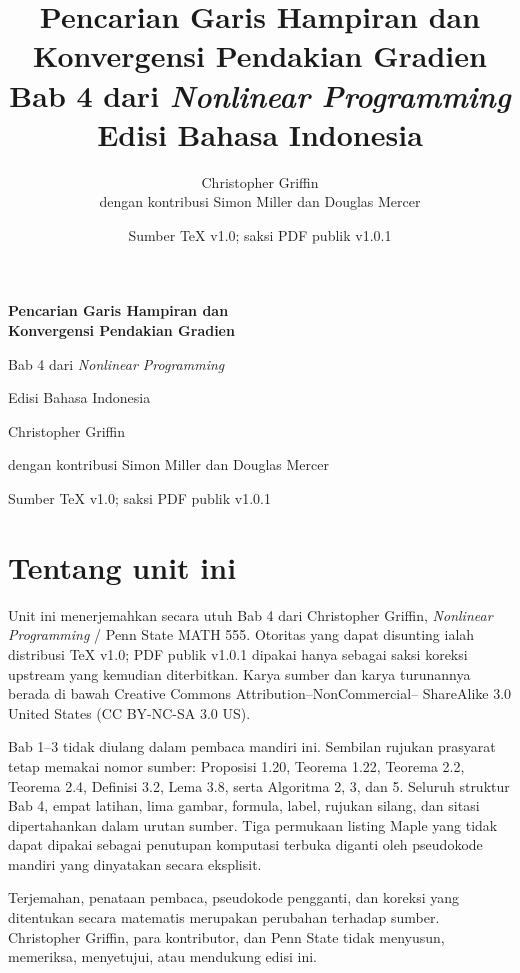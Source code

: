 \documentclass[a4paper,openany,leqno,fleqn,12pt]{amsbook}
\title{Pencarian Garis Hampiran dan Konvergensi Pendakian Gradien\\
       {\large Bab 4 dari \emph{Nonlinear Programming}\\Edisi Bahasa Indonesia}}
\author{Christopher Griffin\\
{\small dengan kontribusi Simon Miller dan Douglas Mercer}}
\date{Sumber TeX v1.0; saksi PDF publik v1.0.1}
\numberwithin{equation}{chapter}
\numberwithin{figure}{chapter}
\theoremstyle{definition}
\theoremstyle{remark}
\begin{document}
\begin{titlepage}
\thispagestyle{empty}
\centering
\vspace*{0.18\textheight}
{\LARGE\bfseries Pencarian Garis Hampiran dan\\
Konvergensi Pendakian Gradien\par}
\vspace{0.8em}
{\large Bab 4 dari \emph{Nonlinear Programming}\par}
\vspace{0.8em}
{\Large Edisi Bahasa Indonesia\par}
\vspace{3em}
{\large Christopher Griffin\par}
\vspace{0.75em}
{\small dengan kontribusi Simon Miller dan Douglas Mercer\par}
\vfill
{\small Sumber TeX v1.0; saksi PDF publik v1.0.1\par}
\end{titlepage}

\frontmatter
\chapter*{Tentang unit ini}
Unit ini menerjemahkan secara utuh Bab 4 dari Christopher Griffin,
\emph{Nonlinear Programming} / Penn State MATH 555. Otoritas yang dapat
disunting ialah distribusi TeX v1.0; PDF publik v1.0.1 dipakai hanya sebagai
saksi koreksi upstream yang kemudian diterbitkan. Karya sumber dan karya
turunannya berada di bawah Creative Commons Attribution--NonCommercial--
ShareAlike 3.0 United States (CC BY-NC-SA 3.0 US).

\hypertarget{penn-external-references}{}%
Bab 1--3 tidak diulang dalam pembaca mandiri ini. Sembilan rujukan prasyarat
tetap memakai nomor sumber: Proposisi 1.20, Teorema 1.22, Teorema 2.2,
Teorema 2.4, Definisi 3.2, Lema 3.8, serta Algoritma 2, 3, dan 5. Seluruh
struktur Bab 4, empat latihan, lima gambar, formula, label, rujukan silang,
dan sitasi dipertahankan dalam urutan sumber. Tiga permukaan listing Maple
yang tidak dapat dipakai sebagai penutupan komputasi terbuka diganti oleh
pseudokode mandiri yang dinyatakan secara eksplisit.

Terjemahan, penataan pembaca, pseudokode pengganti, dan koreksi yang ditentukan
secara matematis merupakan perubahan terhadap sumber. Christopher Griffin,
para kontributor, dan Penn State tidak menyusun, memeriksa, menyetujui, atau
mendukung edisi ini.
\end{document}
